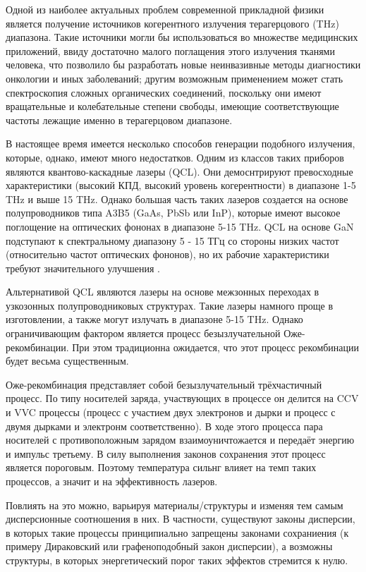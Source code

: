 \documentclass[../main.tex]{subfiles}
\begin{document}
Одной из наиболее актуальных проблем современной прикладной физики является
получение источников когерентного излучения терагерцового (THz) диапазона. Такие
источники могли бы использоваться во множестве медицинских приложений, ввиду достаточно 
малого поглащения этого излучения тканями человека, что позволило бы разработать 
новые неинвазивные методы диагностики онкологии и иных заболеваний; другим возможным 
применением может стать спектроскопия сложных органических соединений, поскольку 
они имеют вращательные и колебательные степени свободы, имеющие соответствующие частоты 
лежащие именно в терагерцовом диапазоне.

В настоящее время имеется несколько способов генерации подобного излучения, которые, однако, 
имеют много недостатков. Одним из классов таких приборов являются квантово-каскадные лазеры (QCL).
Они демоснтрируют превосходные характеристики (высокий КПД, высокий уровень когерентности)
в диапазоне 1-5 THz и выше 15 THz. Однако большая часть таких лазеров создается на основе 
полупроводников типа A3B5 (GaAs, PbSb или InP), которые имеют высокое поглощение на оптических 
фононах в диапазоне 5-15 THz. QCL на основе GaN подступают к спектральному диапазону 5 - 15 ТГц со
стороны низких частот (относительно частот оптических фононов), но их рабочие характеристики 
требуют значительного улучшения \cite{Intro7}.

Альтернативой QCL являются лазеры на основе межзонных переходах в узкозонных полупроводниковых структурах.
Такие лазеры намного проще в изготовлении, а также могут излучать в диапазоне 5-15 THz. Однако ограничивающим
фактором является процесс безызлучательной Оже-рекомбинации. При этом традиционна ожидается, что этот процесс
рекомбинации будет весьма существенным.

Оже-рекомбинация представляет собой безызлучательный трёхчастичный процесс. По типу носителей заряда, участвующих
в процессе он делится на CCV и VVC процессы (процесс с участием двух электронов и дырки и процесс с двумя дырками
и электронм соответственно). В ходе этого процесса пара носителей с противоположным зарядом взаимоуничтожается и
передаёт энергию и импульс третьему. В силу выполнения законов сохранения этот процесс является пороговым.
Поэтому температура сильнг влияет на темп таких процессов, а значит и на эффективность лазеров.

Повлиять на это можно, варьируя материалы/структуры и изменяя тем самым дисперсионные соотношения в них. В частности,
существуют законы дисперсии, в которых такие процессы принципиально запрещены законами сохраниения (к примеру Дираковский 
или графеноподобный закон дисперсии), а возможны структуры, в которых энергетический порог таких эффектов стремится к нулю.
\end{document}
